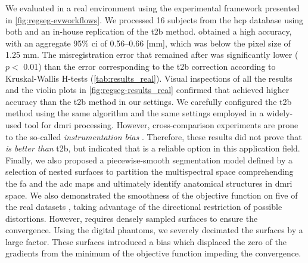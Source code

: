 We evaluated \regseg{} in a real environment using the experimental framework presented
  in \autoref{fig:regseg-evworkflows}.
We processed 16 subjects from the \gls*{hcp} database using both \regseg{}
  and an in-house replication of the \acrfull*{t2b} method.
\Regseg{} obtained a high accuracy, with an aggregate 95\% \gls*{ci} of 0.56--0.66 [mm], which was
  below the pixel size of 1.25 mm.
The misregistration error that remained after \regseg{} was significantly lower ($p <$ 0.01) than the
  error corresponding to the \gls*{t2b} correction according to Kruskal-Wallis H-tests
  (\autoref{tab:results_real}).
Visual inspections of all the results  and the violin plots in
  \autoref{fig:regseg-results_real} confirmed that \regseg{} achieved higher accuracy
  than the \gls*{t2b} method in our settings.
We carefully configured the \gls*{t2b} method using the same algorithm and the
  same settings employed in a widely-used tool for \gls*{dmri} processing.
However, cross-comparison experiments are prone to the so-called \emph{instrumentation bias}
  \citep{tustison_instrumentation_2013}.
Therefore, these results did not prove that \regseg{} \emph{is better than} \gls*{t2b},
  but indicated that \regseg{} is a reliable option in this application field.
Finally, we also proposed a piecewise-smooth segmentation model defined by
  a selection of nested surfaces to partition the multispectral space
  comprehending the \gls*{fa} and the \gls*{adc} maps and ultimately identify anatomical
  structures in \gls*{dmri} space.
We also demonstrated the smoothness of the objective function on five of the real datasets
  , taking advantage of the directional
  restriction of possible distortions.
However, \regseg{} requires densely sampled surfaces to ensure the convergence.
Using the digital phantoms, we severely decimated the surfaces by a large factor.
These surfaces introduced a bias which displaced the zero of the gradients from the
  minimum of the objective function impeding the convergence.


